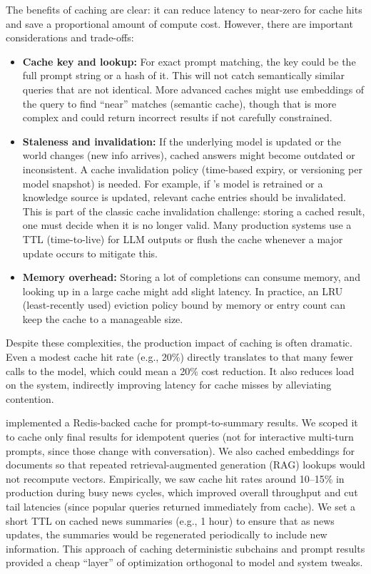 The benefits of caching are clear: it can reduce latency to near-zero for cache hits and save a proportional amount of compute cost. However, there are important considerations and trade-offs:
\begin{itemize}
\item \textbf{Cache key and lookup:} For exact prompt matching, the key could be the full prompt string or a hash of it. This will not catch semantically similar queries that are not identical. More advanced caches might use embeddings of the query to find ``near'' matches (semantic cache), though that is more complex and could return incorrect results if not carefully constrained.
\item \textbf{Staleness and invalidation:} If the underlying model is updated or the world changes (new info arrives), cached answers might become outdated or inconsistent. A cache invalidation policy (time-based expiry, or versioning per model snapshot) is needed. For example, if \ishtar{}’s model is retrained or a knowledge source is updated, relevant cache entries should be invalidated. This is part of the classic cache invalidation challenge: storing a cached result, one must decide when it is no longer valid. Many production systems use a TTL (time-to-live) for LLM outputs or flush the cache whenever a major update occurs to mitigate this.
\item \textbf{Memory overhead:} Storing a lot of completions can consume memory, and looking up in a large cache might add slight latency. In practice, an LRU (least-recently used) eviction policy bound by memory or entry count can keep the cache to a manageable size.
\end{itemize}

Despite these complexities, the production impact of caching is often dramatic. Even a modest cache hit rate (e.g., 20\%) directly translates to that many fewer calls to the model, which could mean a 20\% cost reduction. It also reduces load on the system, indirectly improving latency for cache misses by alleviating contention.

\ishtar{} implemented a Redis-backed cache for prompt-to-summary results. We scoped it to cache only final results for idempotent queries (not for interactive multi-turn prompts, since those change with conversation). We also cached embeddings for documents so that repeated retrieval-augmented generation (RAG) lookups would not recompute vectors. Empirically, we saw cache hit rates around 10--15\% in production during busy news cycles, which improved overall throughput and cut tail latencies (since popular queries returned immediately from cache). We set a short TTL on cached news summaries (e.g., 1 hour) to ensure that as news updates, the summaries would be regenerated periodically to include new information. This approach of caching deterministic subchains and prompt results provided a cheap ``layer'' of optimization orthogonal to model and system tweaks.

